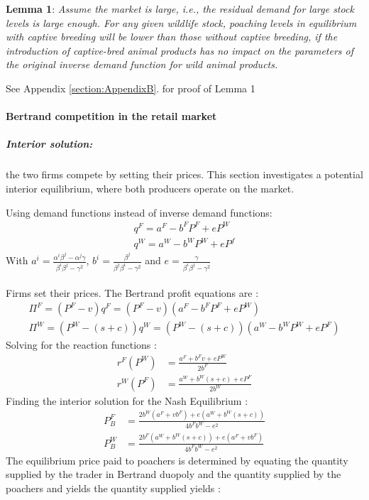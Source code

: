 \begin{displayquote}
    \textbf{Lemma 1}:  \textit{Assume the market is large, i.e., the residual demand for large stock levels is large enough. For any given wildlife stock, poaching levels in equilibrium with captive breeding will be lower than those without captive breeding, if the introduction of captive-bred animal products has no impact on the parameters of the original inverse demand function for wild animal products.}
\end{displayquote}
See Appendix \ref{section:AppendixB}. for proof of Lemma 1
%
\paragraph{Bertrand competition in the retail market}
%
\subparagraph{Interior solution:} the two firms compete by setting their prices. This section investigates a potential interior equilibrium, where both producers operate on the market. 

Using demand functions instead of inverse demand functions: 
\begin{align*}
    q^F = a^F - b^FP^F + e P^W\\
    q^W = a^W - b^WP^W + e P^f
\end{align*}
With $a^i = \frac{\alpha^i \beta^j - \alpha^j \gamma}{\beta^i\beta^j - \gamma^2}$, $b^i = \frac{\beta^j}{\beta^j \beta^i - \gamma^2}$ and $e=\frac{\gamma}{\beta^i \beta^j - \gamma^2}$
\\\\
Firms set their prices. The Bertrand profit equations are : 
\begin{align*}
    \Pi^F = (P^F - v)q^F = (P^F - v)(a^F - b^F P^F + e P^W)\\
    \Pi^W = (P^W - (s+c))q^W = (P^W - (s+c))(a^W - b^W P^W + e P^F)
\end{align*}
Solving for the reaction functions : 
\begin{align}
    r^F(P^W) &= \frac{a^F + b^F v + e P^W}{2b^F}\\
    r^W(P^F) &= \frac{a^W + b^W(s+c) + e P^F}{2b^W}
\label{eq:rf_bertrand}
\end{align}
Finding the interior solution for the Nash Equilibrium :
\begin{align*}
    P^F_B &= \frac{2b^W(a^F + vb^F) + e(a^W + b^W(s+c))}{4b^Fb^W - e^2}\\
    P^W_B &= \frac{2b^F(a^W+ b^W(s+c)) + e(a^F + vb^F)}{4b^Fb^W - e^2}
\end{align*}
The equilibrium price paid to poachers is determined by equating the quantity supplied by the trader in Bertrand duopoly and the quantity supplied by the poachers and yields the quantity supplied yields : \\

